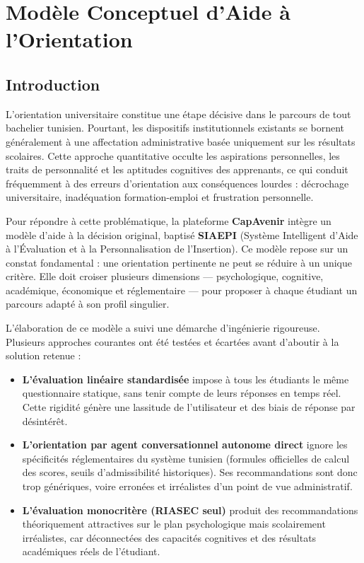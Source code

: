 
\chapter{Modèle Conceptuel d'Aide à l'Orientation}
\label{chap:ai_recommendation}

\section*{Introduction}

L'orientation universitaire constitue une étape décisive dans le parcours de tout bachelier tunisien. Pourtant, les dispositifs institutionnels existants se bornent généralement à une affectation administrative basée uniquement sur les résultats scolaires. Cette approche quantitative occulte les aspirations personnelles, les traits de personnalité et les aptitudes cognitives des apprenants, ce qui conduit fréquemment à des erreurs d'orientation aux conséquences lourdes : décrochage universitaire, inadéquation formation-emploi et frustration personnelle.

Pour répondre à cette problématique, la plateforme \textbf{CapAvenir} intègre un modèle d'aide à la décision original, baptisé \textbf{SIAEPI} (Système Intelligent d'Aide à l'Évaluation et à la Personnalisation de l'Insertion). Ce modèle repose sur un constat fondamental : une orientation pertinente ne peut se réduire à un unique critère. Elle doit croiser plusieurs dimensions — psychologique, cognitive, académique, économique et réglementaire — pour proposer à chaque étudiant un parcours adapté à son profil singulier.

L'élaboration de ce modèle a suivi une démarche d'ingénierie rigoureuse. Plusieurs approches courantes ont été testées et écartées avant d'aboutir à la solution retenue :
\begin{itemize}
    \item \textbf{L'évaluation linéaire standardisée} impose à tous les étudiants le même questionnaire statique, sans tenir compte de leurs réponses en temps réel. Cette rigidité génère une lassitude de l'utilisateur et des biais de réponse par désintérêt.
    \item \textbf{L'orientation par agent conversationnel autonome direct} ignore les spécificités réglementaires du système tunisien (formules officielles de calcul des scores, seuils d'admissibilité historiques). Ses recommandations sont donc trop génériques, voire erronées et irréalistes d'un point de vue administratif.
    \item \textbf{L'évaluation monocritère (RIASEC seul)} produit des recommandations théoriquement attractives sur le plan psychologique mais scolairement irréalistes, car déconnectées des capacités cognitives et des résultats académiques réels de l'étudiant.
\end{itemize}

